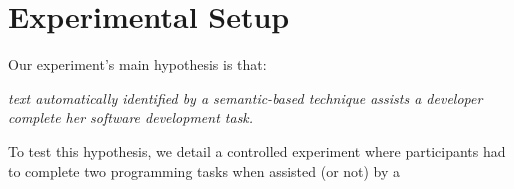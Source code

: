 \clearpage

\section{Experimental Setup}
\label{cp6:procedures}




Our experiment's main hypothesis is that:


\medskip
\begin{bluequote}
    \textit{text automatically identified by a semantic-based technique assists a 
    developer complete her software development task.} 
\end{bluequote}



To test this hypothesis, we detail a controlled experiment where participants
 had to complete two programming tasks when assisted (or not) by a
